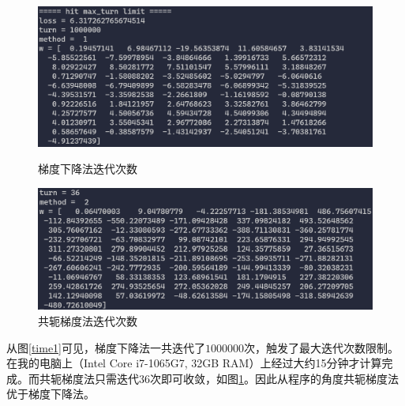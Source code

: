 \begin{figure}[htbp]
    \begin{minipage}[t]{0.5\linewidth}
        \centering
        \includegraphics[width=\textwidth]{figures/Figure_17.png}
        \caption{梯度下降法迭代次数}
        \label{time1}
    \end{minipage}
    \begin{minipage}[t]{0.5\linewidth}
        \centering
        \includegraphics[width=\textwidth]{figures/Figure_18.png}
        \caption{共轭梯度法迭代次数}
        \label{time2}
    \end{minipage}
\end{figure}

从图\ref{time1}可见，梯度下降法一共迭代了$1000000$次，触发了最大迭代次数限制。在我的电脑上（Intel Core i7-1065G7, 32GB RAM）上经过大约15分钟才计算完成。而共轭梯度法只需迭代$36$次即可收敛，如图\ref{time2}。因此从程序的角度共轭梯度法优于梯度下降法。
